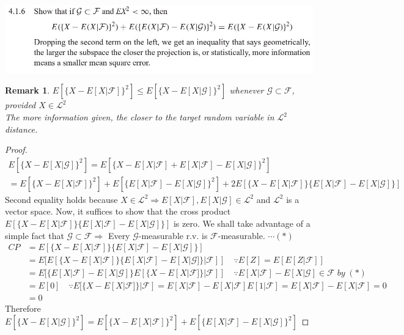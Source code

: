 \documentclass[12pt, A4]{article}
\newtheorem*{remark}{Remark}
\newcommand{\G}{\mathcal{G}}
\newcommand{\F}{\mathcal{F}}
\newcommand{\LL}{\mathcal{L}}
\begin{document}
\includegraphics{Exer4.1.6.JPG}
\begin{remark}
	$E[\{X-E[X|\F]\}^2]\leq E[\{X-E[X|\G]\}^2]$ whenever $\G\subset \F$, provided $X\in \LL^2$ \\ The more information given, the closer to the target random variable in $\LL^2$ distance. 
\end{remark}
\begin{proof}
	\begin{multline*}
		E[\{X-E[X|\G]\}^2] = E[\{X-E[X|\F]+E[X|\F]-E[X|\G]\}^2] \\ = E[\{X-E[X|\F]\}^2]+E[\{E[X|\F]-E[X|\G]\}^2]+2E[\{X-E[X|\F]\}\{E[X|\F]-E[X|\G]\}]
	\end{multline*}
	Second equality holds because $X\in \LL^2 \Rightarrow E[X|\F], E[X|\G]\in \LL^2$ and $\LL^2$ is a vector space. Now, it suffices to show that the cross product $E[\{X-E[X|\F]\}\{E[X|\F]-E[X|\G]\}]$ is zero. We shall take advantage of a simple fact that $\G \subset \F \Rightarrow$ Every $\G$-measurable r.v. is $\F$-measurable. $\cdots (*)$
	\begin{align*}
		CP&=E[\{X-E[X|\F]\}\{E[X|\F]-E[X|\G]\}] \\
		&=E[E[\{X-E[X|\F]\}\{E[X|\F]-E[X|\G]\}|\F]]\quad \because E[Z]=E[E[Z|\F]] \\ &=E[\{E[X|\F]-E[X|\G]\}E[\{X-E[X|\F]\}|\F]] \quad \because E[X|\F]-E[X|\G]\in \F\; by\; (*) \\ &= E[0] \quad \because E[\{X-E[X|\F]\}|\F]=E[X|\F]-E[X|\F]E[1|\F]=E[X|\F]-E[X|\F]=0 \\ &= 0
	\end{align*}
	Therefore $E[\{X-E[X|\G]\}^2] = E[\{X-E[X|\F]\}^2]+E[\{E[X|\F]-E[X|\G]\}^2]$
\end{proof}
\vspace{1cm}
\end{document}
